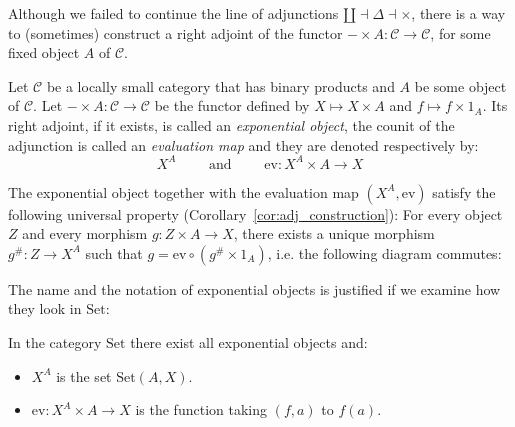 Although we failed to continue the line of adjunctions $\amalg\dashv\Delta\dashv\times$, there is a way to (sometimes) construct a right adjoint of the functor $-\times A:\mathcal{C}\to\mathcal{C}$, for some fixed object $A$ of $\mathcal{C}$.
\begin{definition}\label{def:exp_obj} Let $\mathcal{C}$ be a locally small category that has binary products and $A$ be some object of $\mathcal{C}$. Let $-\times A:\mathcal{C}\to\mathcal{C}$ be the functor defined by
$X\mapsto X\times A$ and $f\mapsto f\times1_A$. Its right adjoint, if it exists, is called an \emph{exponential object}, the counit of the adjunction is called an \emph{evaluation map} and they are denoted respectively by:
\[X^A\qquad\text{ and }\qquad\mathrm{ev}:X^A\times A\to X\]
\end{definition}
\begin{remark}\label{rem:universal_prop_exp} The exponential object together with the evaluation map $(X^A,\mathrm{ev})$ satisfy the following universal property (Corollary~\ref{cor:adj_construction}): For every object $Z$ and every morphism $g:Z\times A\to X$, there exists a unique morphism $g^{\#}:Z\to X^A$ such that $g=\mathrm{ev}\circ(g^{\#}\times1_A)$, i.e. the following diagram commutes:
\begin{center}
\end{center}
\end{remark}
The name and the notation of exponential objects is justified if we examine how they look in $\mathrm{Set}$:
\begin{proposition} In the category $\mathrm{Set}$ there exist all exponential objects and:
\begin{itemize}
\item $X^A$ is the set $\mathrm{Set}(A,X)$.
\item $\mathrm{ev}:X^A\times A\to X$ is the function taking $(f,a)$ to $f(a)$.
\end{itemize}
\end{proposition}
